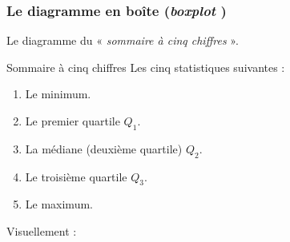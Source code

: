 \documentclass[10pt, french]{article}
\begin{document}
\begin{multicols*}{2}
\subsubsection{Le diagramme en boîte (\og \textit{boxplot} \fg{})}
Le diagramme du « \textit{sommaire à cinq chiffres} ».\\

\begin{conceptgen}{Sommaire à cinq chiffres}
Les cinq statistiques suivantes : 
\begin{enumerate}
	\item	Le minimum.
	\item	Le premier quartile $Q_{1}$.
	\item	La médiane (deuxième quartile) $Q_{2}$.
	\item	Le troisième quartile $Q_{3}$.
	\item	Le maximum.
\end{enumerate}
\end{conceptgen}

Visuellement : 

\begin{center}
\begin{tikzpicture}[x=0.75pt,y=0.75pt,yscale=-1,xscale=1]


\end{tikzpicture}
\end{center}
\end{multicols*}
\end{document}
